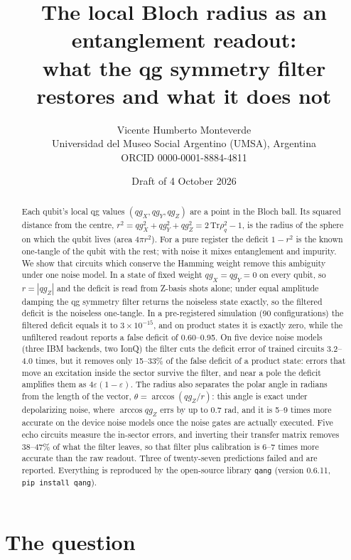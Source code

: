 \documentclass[11pt]{article}
\title{The local Bloch radius as an entanglement readout:\\
what the qg symmetry filter restores and what it does not}
\author{Vicente Humberto Monteverde\\
\small Universidad del Museo Social Argentino (UMSA), Argentina\\
\small ORCID 0000-0001-8884-4811}
\date{\small Draft of 4 October 2026}
\newcommand{\qZ}{qg_Z}
\newcommand{\qX}{qg_X}
\newcommand{\qY}{qg_Y}
\begin{document}
\sloppy
\maketitle

\begin{abstract}
Each qubit's local qg values $(\qX,\qY,\qZ)$ are a point in the Bloch ball. Its squared distance from the centre,
$r^2=\qX^2+\qY^2+\qZ^2=2\,\mathrm{Tr}\rho_q^2-1$, is the radius of the sphere on which the qubit lives (area
$4\pi r^2$). For a pure register the deficit $1-r^2$ is the known one-tangle of the qubit with the rest; with noise it
mixes entanglement and impurity. We show that circuits which conserve the Hamming weight remove this ambiguity under
one noise model. In a state of fixed weight $\qX=\qY=0$ on every qubit, so $r=|\qZ|$ and the deficit is read from
Z-basis shots alone; under equal amplitude damping the qg symmetry filter returns the noiseless state exactly, so the
filtered deficit is the noiseless one-tangle. In a pre-registered simulation (90 configurations) the filtered deficit
equals it to $3\times10^{-15}$, and on product states it is exactly zero, while the unfiltered readout reports a false
deficit of 0.60--0.95. On five device noise models (three IBM backends, two IonQ) the filter cuts the deficit error of
trained circuits 3.2--4.0 times, but it removes only 15--33\% of the false deficit of a product state: errors that
move an excitation inside the sector survive the filter, and near a pole the deficit amplifies them as
$4\varepsilon(1-\varepsilon)$. The radius also separates the polar angle in radians from the length of the vector,
$\theta=\arccos(\qZ/r)$: this angle is exact under depolarizing noise, where $\arccos\qZ$ errs by up to 0.7 rad, and
it is 5--9 times more accurate on the device noise models once the noise gates are actually executed. Five echo circuits measure the in-sector errors, and inverting their
transfer matrix removes 38--47\% of what the filter leaves, so that filter plus calibration is 6--7 times more accurate
than the raw readout. Three of twenty-seven predictions failed and are reported. Everything is reproduced by the
open-source library \texttt{qang} (version 0.6.11, \texttt{pip install qang}).
\end{abstract}

\section{The question}
\end{document}
